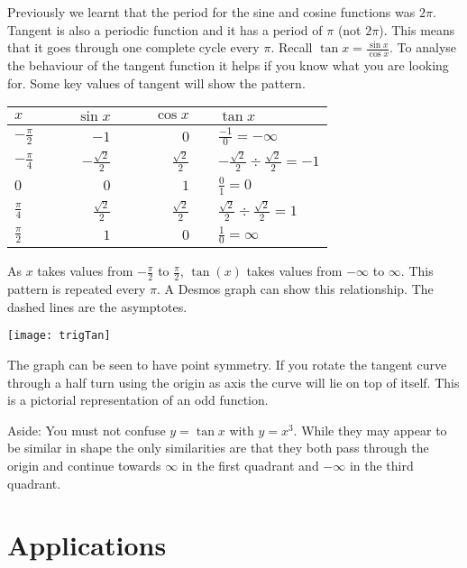 Previously we learnt that the period for the sine and cosine functions was $2 \pi $. Tangent is also a periodic function and it has a period of $\pi $ (not $2 \pi $). This means that it goes through one complete cycle every $\pi$. Recall $\tan  x =\frac{\sin  x}{\cos  x}$. To analyse the behaviour of the tangent function it helps if you know what you are looking for. Some key values of tangent will show the pattern. 
\begin{center}
\begin{tabular}{lrrrl}\toprule
	$x$  & $\qquad\sin  x$  & $\qquad\cos  x$  &\qquad& $\tan  x$  \\
	\midrule
	$ -\frac{\pi }{2}$  & $ -1$  & $0$  && $\frac{ -1}{0} = -\infty $  \\
	\midrule
	$ -\frac{\pi }{4}$  & $ -\frac{\sqrt{2}}{2}$  & $\frac{\sqrt{2}}{2}$  && $ -\frac{\sqrt{2}}{2} \div \frac{\sqrt{2}}{2} = -1$  \\
	\midrule
	$0$  & $0$  & $1$  && $\frac{0}{1} =0$  \\
	\midrule
	$\frac{\pi }{4}$  & $\frac{\sqrt{2}}{2}$  & $\frac{\sqrt{2}}{2}$  && $\frac{\sqrt{2}}{2} \div \frac{\sqrt{2}}{2} =1$  \\
	\midrule
	$\frac{\pi }{2}$  & $1$  & $0$  && $\frac{1}{0} =\infty $  \\
	\bottomrule
\end{tabular}
\end{center}


As $x$ takes values from $ -\frac{\pi }{2}$ to $\frac{\pi }{2}$, $\tan(x)$ takes values from $ -\infty $ to $\infty $. This pattern is repeated every $\pi $. 
A Desmos graph can show this relationship. The dashed lines are the asymptotes.
\begin{center}
\texttt{[image: trigTan]}\end{center}
The graph can be seen to have point symmetry. If you rotate the tangent curve through a half turn using the origin as axis the curve will lie on top of itself. This is a pictorial representation of an odd function.

Aside: You must not confuse $y =\tan  x$ with $y =x^{3}$. While they may appear to be similar in shape the only similarities are that they both pass through the origin and continue towards $\infty $ in the first quadrant and $ -\infty $ in the third quadrant. 

\section{Applications}\label{sec:applications}
